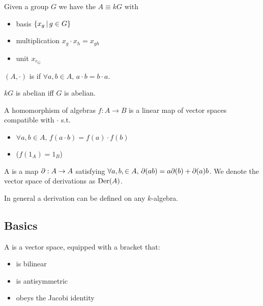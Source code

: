 \documentclass{article}
\begin{document}
\begin{example}
	Given a group $G$ we have the  $A \equiv kG$ with 
	\begin{itemize}
		\item basis $\left\{ x_g \, | \, g \in G \right\}$
		\item multiplication $x_g \cdot x_h = x_{gh}$
		\item unit $x_{e_G}$
	\end{itemize}
\end{example}

\begin{definition}
	$(A,\cdot)$ is  if $\forall a,b \in A, \, a \cdot b = b \cdot a$. 
\end{definition}

\begin{example}
	$kG$ is abelian iff $G$ is abelian. 
\end{example}

\begin{definition}
	A homomorphism of algebras $f : A \to B$ is a linear map of vector spaces compatible with $\cdot$ s.t. 
	\begin{itemize}
		\item $\forall a,b \in A, \, f(a\cdot b ) = f(a) \cdot f(b)$
		\item ($f(1_A) = 1_B$)
	\end{itemize}
\end{definition}

\begin{definition}
	A  is a map $\partial:A \to A$ satisfying $\forall a,b, \in A, \, \partial(ab) = a \partial(b) + \partial(a) b $. We denote the vector space of derivations as $\operatorname{Der}(A)$. 
\end{definition}

\begin{remark}
	In general a derivation can be defined on any $k$-algebra.
\end{remark}
\subsection{Basics}

\begin{definition} 
	A  is a vector space, equipped with a bracket that:
	\begin{itemize}
		\item is bilinear
		\item is antisymmetric
		\item obeys the Jacobi identity
	\end{itemize}
\end{definition}
\end{document}
